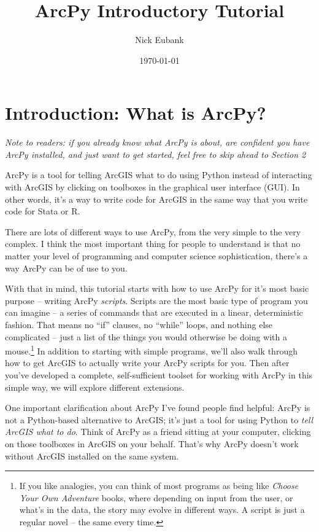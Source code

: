 \documentclass[12pt]{article}
\title{ArcPy Introductory Tutorial}
\author{Nick Eubank}
\date{\today}
\begin{document}
 
\maketitle

\tableofcontents

\section{Introduction: What is ArcPy?}

\begin{center}
\emph{Note to readers: if you already know what ArcPy is about, are confident you have ArcPy installed, and just want to get started, feel free to skip ahead to Section 2}
\end{center}


ArcPy is a tool for telling ArcGIS what to do using Python instead of interacting with ArcGIS by clicking on toolboxes in the graphical user interface (GUI). In other words, it's a way to write code for ArcGIS in the same way that you write code for Stata or R. 

There are lots of different ways to use ArcPy, from the very simple to the very complex. I think the most important thing for people to understand is that no matter your level of programming and computer science sophistication, there's a way ArcPy can be of use to you. 

With that in mind, this tutorial starts with how to use ArcPy for it's most basic purpose -- writing ArcPy \emph{scripts}. Scripts are the most basic type of program you can imagine -- a series of commands that are executed in a linear, deterministic fashion. That means no ``if'' clauses, no ``while'' loops, and nothing else complicated -- just a list of the things you would otherwise be doing with a mouse.\footnote{If you like analogies, you can think of most programs as being like \emph{Choose Your Own Adventure} books, where depending on input from the user, or what's in the data, the story may evolve in different ways. A script is just a regular novel -- the same every time.} In addition to starting with simple programs, we'll also walk through how to get ArcGIS to actually write your ArcPy scripts for you.  Then after you've developed a complete, self-sufficient toolset for working with ArcPy in this simple way, we will explore different extensions. 

One important clarification about ArcPy I've found people find helpful: ArcPy is not a Python-based alternative to ArcGIS; it's just a tool for using Python to \emph{tell ArcGIS what to do}. Think of ArcPy as a friend sitting at your computer, clicking on those toolboxes in ArcGIS on your behalf. That's why ArcPy doesn't work without ArcGIS installed on the same system. 
\end{document}
